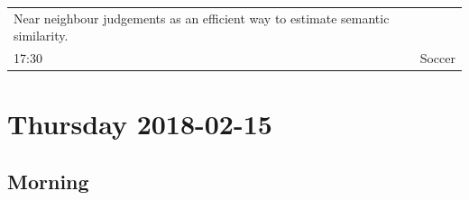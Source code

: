 \documentclass[]{article}
\begin{document}
\begin{longtable}[]{@{}lll@{}}
\begin{minipage}[t]{0.50\columnwidth}
Near neighbour judgements as an efficient way to estimate semantic
similarity.\strut
\end{minipage}\tabularnewline
\begin{minipage}[t]{0.03\columnwidth}\raggedright\strut
17:30\strut
\end{minipage} & \begin{minipage}[t]{0.39\columnwidth}\raggedright\strut
\strut
\end{minipage} & \begin{minipage}[t]{0.50\columnwidth}\raggedright\strut
Soccer\strut
\end{minipage}\tabularnewline
\bottomrule
\end{longtable}

\section{Thursday 2018-02-15}\label{thursday-2018-02-15}

\subsection{Morning}\label{morning-1}
\end{document}
